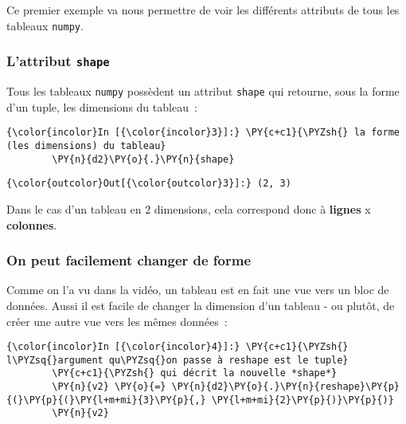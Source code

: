     Ce premier exemple va nous permettre de voir les différents attributs de
tous les tableaux \texttt{numpy}.

    \hypertarget{lattribut-shape}{%
\subsubsection{\texorpdfstring{L'attribut
\texttt{shape}}{L'attribut shape}}\label{lattribut-shape}}

    Tous les tableaux \texttt{numpy} possèdent un attribut \texttt{shape}
qui retourne, sous la forme d'un tuple, les dimensions du tableau~:

    \begin{Verbatim}[commandchars=\\\{\},frame=single,framerule=0.3mm,rulecolor=\color{cellframecolor}]
{\color{incolor}In [{\color{incolor}3}]:} \PY{c+c1}{\PYZsh{} la forme (les dimensions) du tableau}
        \PY{n}{d2}\PY{o}{.}\PY{n}{shape}
\end{Verbatim}


\begin{Verbatim}[commandchars=\\\{\},frame=single,framerule=0.3mm,rulecolor=\color{cellframecolor}]
{\color{outcolor}Out[{\color{outcolor}3}]:} (2, 3)
\end{Verbatim}
            
    Dans le cas d'un tableau en 2 dimensions, cela correspond donc à
\textbf{lignes} x \textbf{colonnes}.

    \hypertarget{on-peut-facilement-changer-de-forme}{%
\subsubsection{On peut facilement changer de
forme}\label{on-peut-facilement-changer-de-forme}}

    Comme on l'a vu dans la vidéo, un tableau est en fait une vue vers un
bloc de données. Aussi il est facile de changer la dimension d'un
tableau - ou plutôt, de créer une autre vue vers les mêmes données~:

    \begin{Verbatim}[commandchars=\\\{\},frame=single,framerule=0.3mm,rulecolor=\color{cellframecolor}]
{\color{incolor}In [{\color{incolor}4}]:} \PY{c+c1}{\PYZsh{} l\PYZsq{}argument qu\PYZsq{}on passe à reshape est le tuple}
        \PY{c+c1}{\PYZsh{} qui décrit la nouvelle *shape*}
        \PY{n}{v2} \PY{o}{=} \PY{n}{d2}\PY{o}{.}\PY{n}{reshape}\PY{p}{(}\PY{p}{(}\PY{l+m+mi}{3}\PY{p}{,} \PY{l+m+mi}{2}\PY{p}{)}\PY{p}{)}
        \PY{n}{v2}
\end{Verbatim}


